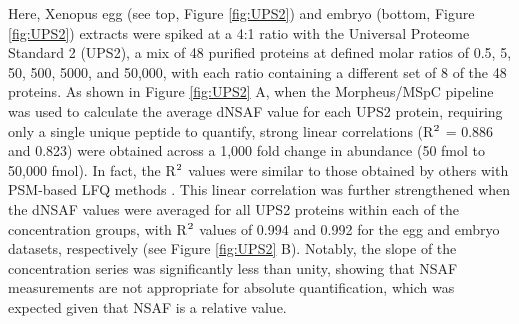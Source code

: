 Here, Xenopus egg (see top, Figure \ref{fig:UPS2}) and embryo (bottom, Figure \ref{fig:UPS2}) extracts were spiked at a 4:1 ratio with the Universal Proteome Standard 2 (UPS2), a mix of 48 purified proteins at defined molar ratios of 0.5, 5, 50, 500, 5000, and 50,000, with each ratio containing a different set of 8 of the 48 proteins.
As shown in Figure \ref{fig:UPS2} A, when the Morpheus/MSpC pipeline was used to calculate the average dNSAF value for each UPS2 protein, requiring only a single unique peptide to quantify, strong linear correlations (R$\textsuperscript{2}$ = 0.886 and 0.823) were obtained across a 1,000 fold change in abundance (50 fmol to 50,000 fmol).
In fact, the R$\textsuperscript{2}$ values were similar to those obtained by others with PSM-based LFQ methods \citep{cox14, tu14}.
This linear correlation was further strengthened when the dNSAF values were averaged for all UPS2 proteins within each of the concentration groups, with R$\textsuperscript{2}$ values of 0.994 and 0.992 for the egg and embryo datasets, respectively (see Figure \ref{fig:UPS2} B).
Notably, the slope of the concentration series was significantly less than unity, showing that NSAF measurements are not appropriate for absolute quantification, which was expected given that NSAF is a relative value.  

